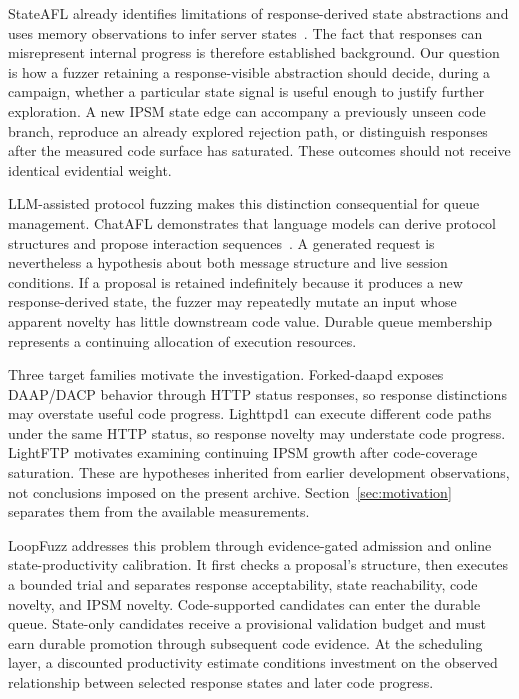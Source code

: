 \documentclass[final,5p,times,number]{elsarticle}
\begin{document}
StateAFL already identifies limitations of response-derived state abstractions and uses memory observations to infer server states~\cite{stateafl}. The fact that responses can misrepresent internal progress is therefore established background. Our question is how a fuzzer retaining a response-visible abstraction should decide, during a campaign, whether a particular state signal is useful enough to justify further exploration. A new IPSM state edge can accompany a previously unseen code branch, reproduce an already explored rejection path, or distinguish responses after the measured code surface has saturated. These outcomes should not receive identical evidential weight.

LLM-assisted protocol fuzzing makes this distinction consequential for queue management. ChatAFL demonstrates that language models can derive protocol structures and propose interaction sequences~\cite{chatafl}. A generated request is nevertheless a hypothesis about both message structure and live session conditions. If a proposal is retained indefinitely because it produces a new response-derived state, the fuzzer may repeatedly mutate an input whose apparent novelty has little downstream code value. Durable queue membership represents a continuing allocation of execution resources.

Three target families motivate the investigation. Forked-daapd exposes DAAP/DACP behavior through HTTP status responses, so response distinctions may overstate useful code progress. Lighttpd1 can execute different code paths under the same HTTP status, so response novelty may understate code progress. LightFTP motivates examining continuing IPSM growth after code-coverage saturation. These are hypotheses inherited from earlier development observations, not conclusions imposed on the present archive. Section~\ref{sec:motivation} separates them from the available measurements.

LoopFuzz addresses this problem through evidence-gated admission and online state-productivity calibration. It first checks a proposal's structure, then executes a bounded trial and separates response acceptability, state reachability, code novelty, and IPSM novelty. Code-supported candidates can enter the durable queue. State-only candidates receive a provisional validation budget and must earn durable promotion through subsequent code evidence. At the scheduling layer, a discounted productivity estimate conditions investment on the observed relationship between selected response states and later code progress.
\end{document}
